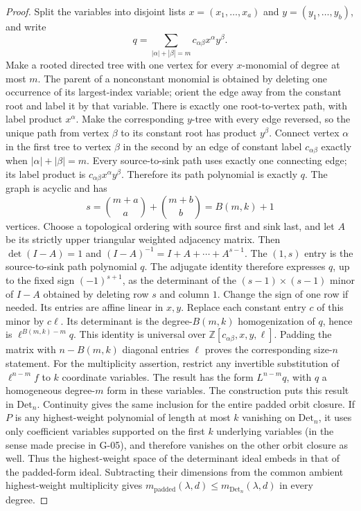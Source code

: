\documentclass[11pt,a4paper]{article}
\theoremstyle{definition}\newtheorem{definition}{Definition}
\begin{document}
\begin{proof}
Split the variables into disjoint lists $x=(x_1,\ldots,x_a)$ and $y=(y_1,\ldots,y_b)$, and write
\[
 q=\sum_{|\alpha|+|\beta|=m}c_{\alpha\beta}x^\alpha y^\beta.
\]
Make a rooted directed tree with one vertex for every $x$-monomial of degree at most $m$. The parent of a nonconstant monomial is obtained by deleting one occurrence of its largest-index variable; orient the edge away from the constant root and label it by that variable. There is exactly one root-to-vertex path, with label product $x^\alpha$. Make the corresponding $y$-tree with every edge reversed, so the unique path from vertex $\beta$ to its constant root has product $y^\beta$. Connect vertex $\alpha$ in the first tree to vertex $\beta$ in the second by an edge of constant label $c_{\alpha\beta}$ exactly when $|\alpha|+|\beta|=m$. Every source-to-sink path uses exactly one connecting edge; its label product is $c_{\alpha\beta}x^\alpha y^\beta$. Therefore its path polynomial is exactly $q$. The graph is acyclic and has
\[
 s=\binom{m+a}{a}+\binom{m+b}{b}=B(m,k)+1
\]
vertices.
Choose a topological ordering with source first and sink last, and let $A$ be its strictly upper triangular weighted adjacency matrix. Then $\det(I-A)=1$ and $(I-A)^{-1}=I+A+\cdots+A^{s-1}$. The $(1,s)$ entry is the source-to-sink path polynomial $q$. The adjugate identity therefore expresses $q$, up to the fixed sign $(-1)^{s+1}$, as the determinant of the $(s-1)\times(s-1)$ minor of $I-A$ obtained by deleting row $s$ and column $1$. Change the sign of one row if needed. Its entries are affine linear in $x,y$.
Replace each constant entry $c$ of this minor by $c\ell$. Its determinant is the degree-$B(m,k)$ homogenization of $q$, hence is $\ell^{B(m,k)-m}q$. This identity is universal over $\mathbb Z[c_{\alpha\beta},x,y,\ell]$. Padding the matrix with $n-B(m,k)$ diagonal entries $\ell$ proves the corresponding size-$n$ statement.
For the multiplicity assertion, restrict any invertible substitution of $\ell^{n-m}f$ to $k$ coordinate variables. The result has the form $L^{n-m}q$, with $q$ a homogeneous degree-$m$ form in these variables. The construction puts this result in $\mathrm{Det}_n$. Continuity gives the same inclusion for the entire padded orbit closure. If $P$ is any highest-weight polynomial of length at most $k$ vanishing on $\mathrm{Det}_n$, it uses only coefficient variables supported on the first $k$ underlying variables (in the sense made precise in G-05), and therefore vanishes on the other orbit closure as well. Thus the highest-weight space of the determinant ideal embeds in that of the padded-form ideal. Subtracting their dimensions from the common ambient highest-weight multiplicity gives $m_{\mathrm{padded}}(\lambda,d)\leq m_{\mathrm{Det}_n}(\lambda,d)$ in every degree.
\end{proof}
\end{document}
